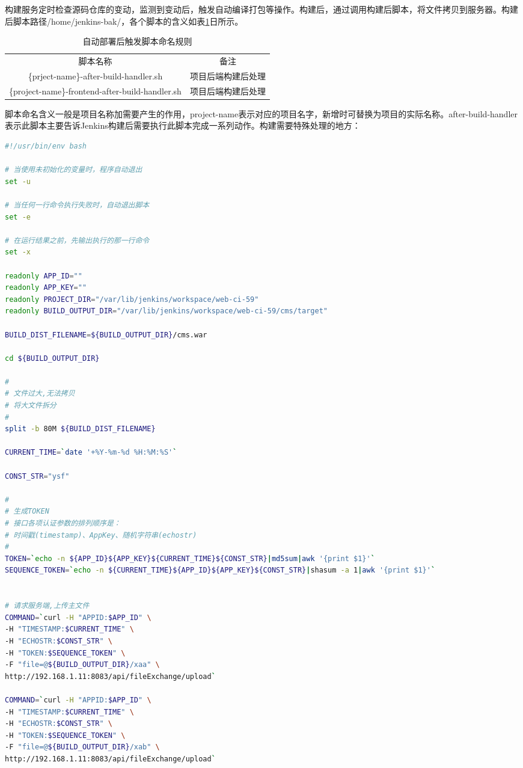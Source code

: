 \documentclass{book}
\begin{document}
构建服务定时检查源码仓库的变动，监测到变动后，触发自动编译打包等操作。构建后，通过调用构建后脚本，将文件拷贝到服务器。构建后脚本路径/home/jenkins-bak/，各个脚本的含义如表\ref{table:handlernamingrule}日所示。

\begin{table}[htbp]
	\caption{自动部署后触发脚本命名规则}
	\label{table:handlernamingrule}
	\begin{center}
		\begin{tabular}{|c|p{5cm}|}
			\hline
			\multirow{1}{*}{脚本名称}		 
			& \multicolumn{1}{c|}{备注}\\			
			\cline{1-2}
			\{prject-name\}-after-build-handler.sh &  项目后端构建后处理 \\
			\hline
			\{project-name\}-frontend-after-build-handler.sh  & 项目后端构建后处理 \\		
			\hline				
		\end{tabular}	
	\end{center}
\end{table}

脚本命名含义一般是项目名称加需要产生的作用，project-name表示对应的项目名字，新增时可替换为项目的实际名称。after-build-handler表示此脚本主要告诉Jenkins构建后需要执行此脚本完成一系列动作。构建需要特殊处理的地方：


\begin{lstlisting}[language=Bash]
#!/usr/bin/env bash

# 当使用未初始化的变量时，程序自动退出
set -u

# 当任何一行命令执行失败时，自动退出脚本
set -e

# 在运行结果之前，先输出执行的那一行命令
set -x

readonly APP_ID=""
readonly APP_KEY=""
readonly PROJECT_DIR="/var/lib/jenkins/workspace/web-ci-59"
readonly BUILD_OUTPUT_DIR="/var/lib/jenkins/workspace/web-ci-59/cms/target"

BUILD_DIST_FILENAME=${BUILD_OUTPUT_DIR}/cms.war

cd ${BUILD_OUTPUT_DIR}

#
# 文件过大,无法拷贝
# 将大文件拆分
#
split -b 80M ${BUILD_DIST_FILENAME}

CURRENT_TIME=`date '+%Y-%m-%d %H:%M:%S'`

CONST_STR="ysf"

#
# 生成TOKEN
# 接口各项认证参数的排列顺序是：
# 时间戳(timestamp)、AppKey、随机字符串(echostr)
#
TOKEN=`echo -n ${APP_ID}${APP_KEY}${CURRENT_TIME}${CONST_STR}|md5sum|awk '{print $1}'`
SEQUENCE_TOKEN=`echo -n ${CURRENT_TIME}${APP_ID}${APP_KEY}${CONST_STR}|shasum -a 1|awk '{print $1}'`


# 请求服务端,上传主文件
COMMAND=`curl -H "APPID:$APP_ID" \
-H "TIMESTAMP:$CURRENT_TIME" \
-H "ECHOSTR:$CONST_STR" \
-H "TOKEN:$SEQUENCE_TOKEN" \
-F "file=@${BUILD_OUTPUT_DIR}/xaa" \
http://192.168.1.11:8083/api/fileExchange/upload`

COMMAND=`curl -H "APPID:$APP_ID" \
-H "TIMESTAMP:$CURRENT_TIME" \
-H "ECHOSTR:$CONST_STR" \
-H "TOKEN:$SEQUENCE_TOKEN" \
-F "file=@${BUILD_OUTPUT_DIR}/xab" \
http://192.168.1.11:8083/api/fileExchange/upload`
\end{lstlisting}
\end{document}
